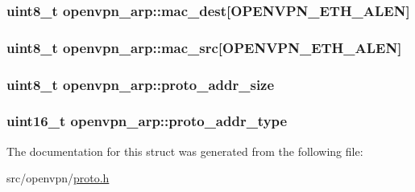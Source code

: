 \subsubsection[{mac\+\_\+dest}]{\setlength{\rightskip}{0pt plus 5cm}uint8\+\_\+t openvpn\+\_\+arp\+::mac\+\_\+dest\mbox{[}{\bf O\+P\+E\+N\+V\+P\+N\+\_\+\+E\+T\+H\+\_\+\+A\+L\+E\+N}\mbox{]}}\label{structopenvpn__arp_a14db5afc7441d184a86814d7fb3ae02d}
\hypertarget{structopenvpn__arp_a05d07f54de71b37856289afd58b365bb}{}
\subsubsection[{mac\+\_\+src}]{\setlength{\rightskip}{0pt plus 5cm}uint8\+\_\+t openvpn\+\_\+arp\+::mac\+\_\+src\mbox{[}{\bf O\+P\+E\+N\+V\+P\+N\+\_\+\+E\+T\+H\+\_\+\+A\+L\+E\+N}\mbox{]}}\label{structopenvpn__arp_a05d07f54de71b37856289afd58b365bb}
\hypertarget{structopenvpn__arp_a870c9834a3c747ed8c5e584f5905bd7e}{}
\subsubsection[{proto\+\_\+addr\+\_\+size}]{\setlength{\rightskip}{0pt plus 5cm}uint8\+\_\+t openvpn\+\_\+arp\+::proto\+\_\+addr\+\_\+size}\label{structopenvpn__arp_a870c9834a3c747ed8c5e584f5905bd7e}
\hypertarget{structopenvpn__arp_a8781e8a314c8a5fb35a1415fa57afed9}{}
\subsubsection[{proto\+\_\+addr\+\_\+type}]{\setlength{\rightskip}{0pt plus 5cm}uint16\+\_\+t openvpn\+\_\+arp\+::proto\+\_\+addr\+\_\+type}\label{structopenvpn__arp_a8781e8a314c8a5fb35a1415fa57afed9}


The documentation for this struct was generated from the following file\+:\begin{DoxyCompactItemize}
\item 
src/openvpn/\hyperlink{proto_8h}{proto.\+h}\end{DoxyCompactItemize}
